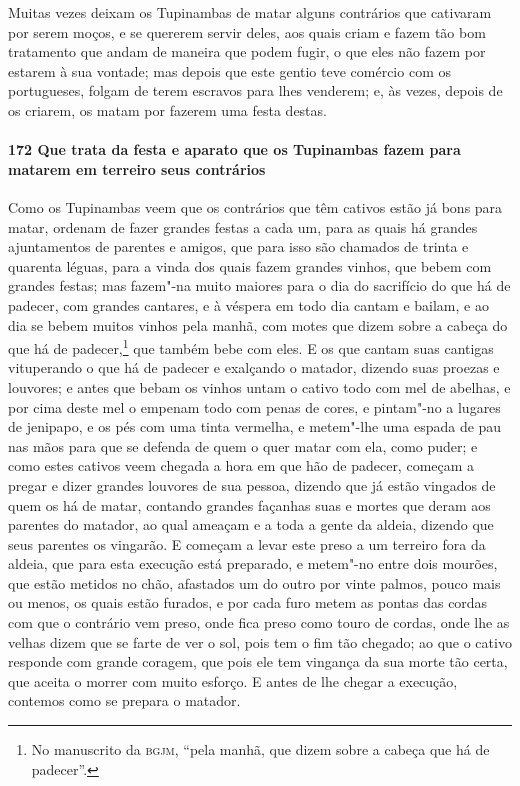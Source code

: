 \begin{linenumbers}
Muitas vezes deixam os Tupinambas de matar alguns contrários que cativaram por serem
moços, e se quererem servir deles, aos quais criam e fazem tão bom tratamento que andam de
maneira que podem fugir, o que eles não fazem por estarem à sua vontade; mas depois que
este gentio teve comércio com os portugueses, folgam de terem escravos para lhes venderem;
e, às vezes, depois de os criarem, os matam por fazerem uma festa destas.

\paragraph{172 Que trata da festa e aparato que os Tupinambas fazem para matarem em
terreiro seus contrários}\quad
Como os Tupinambas veem que os contrários que têm cativos estão já bons para matar,
ordenam de fazer grandes festas a cada um, para as quais há grandes ajuntamentos de
parentes e amigos, que para isso são chamados de trinta e quarenta léguas, para a vinda
dos quais fazem grandes vinhos, que bebem com grandes festas; mas fazem"-na muito maiores
para o dia do sacrifício do que há de padecer, com grandes cantares, e à véspera em todo
dia cantam e bailam, e ao dia se bebem muitos vinhos pela manhã, com motes que dizem sobre
a cabeça do que há de padecer,\footnote{ No manuscrito da \textsc{bgjm}, ``pela manhã, que
dizem sobre a cabeça que há de padecer''.} que também bebe com eles. E os que cantam suas
cantigas vituperando o que há de padecer e exalçando o matador, dizendo suas proezas e
louvores; e antes que bebam os vinhos untam o cativo todo com mel de abelhas, e por cima
deste mel o empenam todo com penas de cores, e pintam"-no a lugares de jenipapo, e os pés
com uma tinta vermelha, e metem"-lhe uma espada de pau nas mãos para que se defenda de quem
o quer matar com ela, como puder; e como estes cativos veem chegada a hora em que hão de
padecer, começam a pregar e dizer grandes louvores de sua pessoa, dizendo que já estão
vingados de quem os há de matar, contando grandes façanhas suas e mortes que deram aos
parentes do matador, ao qual ameaçam e a toda a gente da aldeia, dizendo que seus parentes
os vingarão. E começam a levar este preso a um terreiro fora da aldeia, que para esta
execução está preparado, e metem"-no entre dois mourões, que estão metidos no chão,
afastados um do outro por vinte palmos, pouco mais ou menos, os quais estão furados, e por
cada furo metem as pontas das cordas com que o contrário vem preso, onde fica preso como
touro de cordas, onde lhe as velhas dizem que se farte de ver o sol, pois tem o fim tão
chegado; ao que o cativo responde com grande coragem, que pois ele tem vingança da sua
morte tão certa, que aceita o morrer com muito esforço. E antes de lhe chegar a execução,
contemos como se prepara o matador.


\end{linenumbers}
